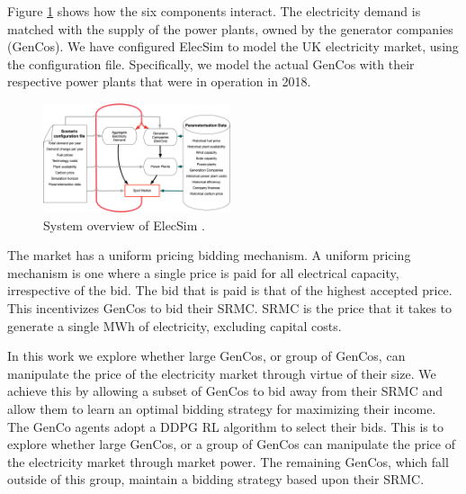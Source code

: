 \documentclass[conference]{IEEEtran}
\begin{document}
Figure \ref{fig:model_details} shows how the six components interact. The electricity demand is matched with the supply of the power plants, owned by the generator companies (GenCos). We have configured ElecSim to model the UK electricity market, using the configuration file. Specifically, we model the actual GenCos with their respective power plants that were in operation in 2018.



\begin{figure}
    \includegraphics[width=0.49\textwidth]{figures/methedology/system-overview-v2}
    \caption{System overview of ElecSim \cite{Kell}.}
    \label{fig:model_details}
\end{figure}

The market has a uniform pricing bidding mechanism. A uniform pricing mechanism is one where a single price is paid for all electrical capacity, irrespective of the bid. The bid that is paid is that of the highest accepted price. This incentivizes GenCos to bid their SRMC. SRMC is the price that it takes to generate a single MWh of electricity, excluding capital costs. 

In this work we explore whether large GenCos, or group of GenCos, can manipulate the price of the electricity market through virtue of their size. We achieve this by allowing a subset of GenCos to bid away from their SRMC and allow them to learn an optimal bidding strategy for maximizing their income. The GenCo agents adopt a DDPG RL algorithm to select their bids. This is to explore whether large GenCos, or a group of GenCos can manipulate the price of the electricity market through market power. The remaining GenCos, which fall outside of this group, maintain a bidding strategy based upon their SRMC.
\end{document}
